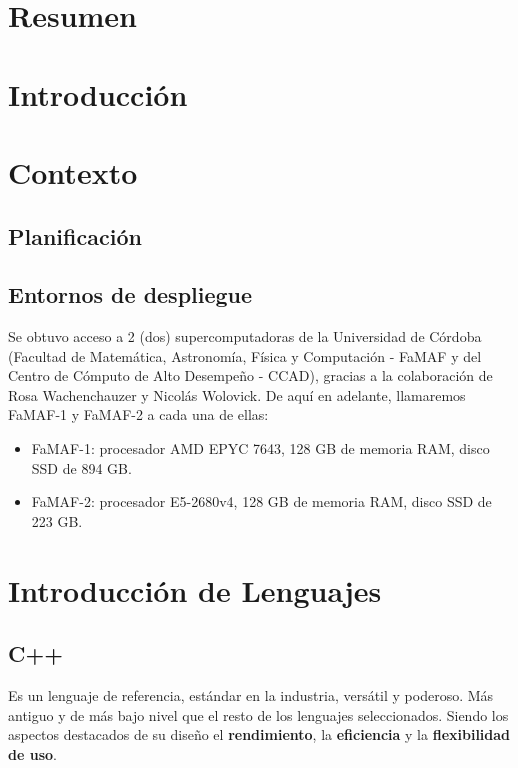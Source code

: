 \documentclass[11pt]{article}
\let\Oldsection\section
\renewcommand{\section}{\FloatBarrier\Oldsection}
\let\Oldsubsection\subsection
\renewcommand{\subsection}{\FloatBarrier\Oldsubsection}
\begin{document}
\tableofcontents
\newpage

\section{Resumen}

\section{Introducción}

\section{Contexto}

\subsection{Planificación}

\subsection{Entornos de despliegue} \label{sec:deploy_envs}

Se obtuvo acceso a 2 (dos) supercomputadoras de la Universidad de Córdoba (Facultad de Matemática, Astronomía, Física y Computación - FaMAF y del Centro de Cómputo de Alto Desempeño - CCAD), gracias a la colaboración de Rosa Wachenchauzer y Nicolás Wolovick. De aquí en adelante, llamaremos FaMAF-1 y FaMAF-2 a cada una de ellas:
\begin{itemize}
    \item FaMAF-1: procesador AMD EPYC 7643, 128 GB de memoria RAM, disco SSD de 894 GB.
    \item FaMAF-2: procesador E5-2680v4, 128 GB de memoria RAM, disco SSD de 223 GB.
\end{itemize}

\section{Introducción de Lenguajes}

\subsection{C++}

Es un lenguaje de referencia, estándar en la industria, versátil y poderoso. Más antiguo y de más bajo nivel que el resto de los lenguajes seleccionados. Siendo los aspectos destacados de su diseño el \textbf{rendimiento}, la \textbf{eficiencia} y la \textbf{flexibilidad de uso}.
\end{document}
